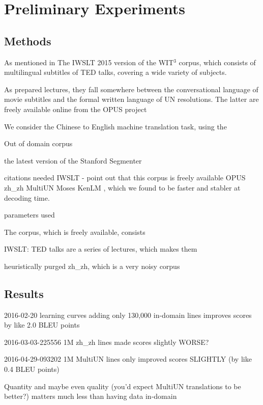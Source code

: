 \section{Preliminary Experiments}
\label{experiments}

\subsection{Methods}
As mentioned in 
The IWSLT 2015 version of the WIT$^3$ corpus, which consists of multilingual subtitles of TED talks, covering a wide variety of subjects. 

As prepared lectures, they fall somewhere between the conversational language of movie subtitles and the formal written language of UN resolutions.
The latter are freely available online from the OPUS project  

We consider the Chinese to English machine translation task, using the 

Out of domain corpus

the latest version of the Stanford Segmenter 

citations needed
IWSLT  - point out that this corpus is freely available
OPUS zh\_zh  MultiUN 
Moses 
KenLM , which we found to be faster and stabler at decoding time.

parameters used

The corpus, which is freely available, consists 

IWSLT: TED talks are a series of lectures, which makes them 



heuristically purged zh\_zh, which is a very noisy corpus

\subsection{Results}

2016-02-20 learning curves adding only 130,000 in-domain lines improves scores by like 2.0 BLEU points

2016-03-03-225556 1M zh\_zh lines made scores slightly WORSE?

2016-04-29-093202 1M MultiUN lines only improved scores SLIGHTLY (by like 0.4 BLEU points)

Quantity and maybe even quality (you'd expect MultiUN translations to be better?) matters much less than having data in-domain

